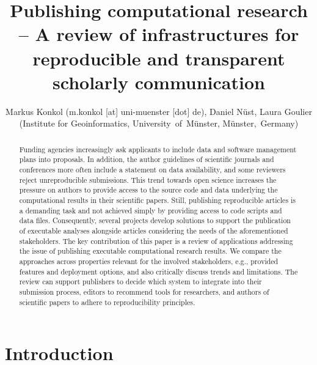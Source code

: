\documentclass[onecolumn]{article}
\title{Publishing computational research -- A review of infrastructures for
reproducible and transparent scholarly communication}
\author{Markus Konkol (m.konkol {[}at{]} uni-muenster {[}dot{]} de), Daniel
Nüst, Laura Goulier (Institute for Geoinformatics,
University~of~Münster, Münster,~Germany)}
\date{}
\begin{document}
\maketitle
\begin{abstract}
Funding agencies increasingly ask applicants to include data and
software management plans into proposals. In addition, the author
guidelines of scientific journals and conferences more often include a
statement on data availability, and some reviewers reject unreproducible
submissions. This trend towards open science increases the pressure on
authors to provide access to the source code and data underlying the
computational results in their scientific papers. Still, publishing
reproducible articles is a demanding task and not achieved simply by
providing access to code scripts and data files. Consequently, several
projects develop solutions to support the publication of executable
analyses alongside articles considering the needs of the aforementioned
stakeholders. The key contribution of this paper is a review of
applications addressing the issue of publishing executable computational
research results. We compare the approaches across properties relevant
for the involved stakeholders, e.g., provided features and deployment
options, and also critically discuss trends and limitations. The review
can support publishers to decide which system to integrate into their
submission process, editors to recommend tools for researchers, and
authors of scientific papers to adhere to reproducibility principles.
\end{abstract}

\hypertarget{introduction}{%
\section{Introduction}\label{introduction}}
\end{document}
